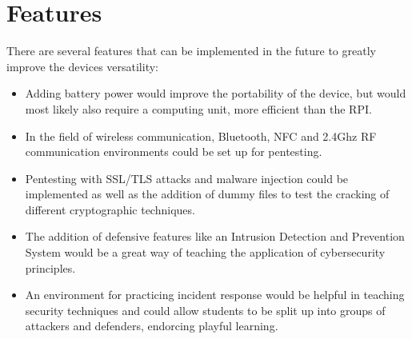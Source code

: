 \section{Features}
There are several features that can be implemented in the future to greatly improve the devices versatility:
\begin{itemize}
    \item Adding battery power would improve the portability of the device, but would most likely also require a computing unit, more efficient than the RPI.
    \item In the field of wireless communication, Bluetooth, NFC and 2.4Ghz RF communication environments could be set up for pentesting.
    \item Pentesting with SSL/TLS attacks and malware injection could be implemented as well as the addition of dummy files to test the cracking of different cryptographic techniques.
    \item The addition of defensive features like an Intrusion Detection and Prevention System would be a great way of teaching the application of cybersecurity principles.
    \item An environment for practicing incident response would be helpful in teaching security techniques and could allow students to be split up into groups of attackers and defenders, endorcing playful learning.
\end{itemize}
